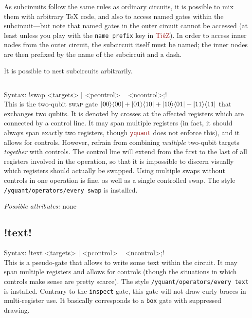 \documentclass{scrartcl}
\def\TikZ{\textcolor{brown}{Ti\textit kZ}}
\def\pkg#1{\textcolor{brown}{\texttt{#1}}}
\def\ttlink{\link\texttt}
\def\Yquant{\pkg{yquant}}
\def\ketbra#1#2{\ket{#1}\!\bra{#2}}
\begin{document}
\begin{itemize}
               As subcircuits follow the same rules as ordinary circuits, it is possible to mix them with arbitrary \TeX{} code, and also to access named gates within the subcircuit---but note that named gates in the outer circuit cannot be accessed (at least unless you play with the \texttt{name prefix} key in \TikZ).
               In order to access inner nodes from the outer circuit, the subcircuit itself must be named; the inner nodes are then prefixed by the name of the subcircuit and a dash.

               It is possible to nest subcircuits arbitrarily.
         \end{itemize}

      \subsection{\texorpdfstring{}{swap}}
         Syntax: \yquant!swap <targets> | <pcontrol> ~ <ncontrol>;! \\
         This is the two\hyp qubit \textsc{swap} gate $\ketbra{00}{00} + \ketbra{01}{10} + \ketbra{10}{01} + \ketbra{11}{11}$ that exchanges two qubits.
         It is denoted by crosses at the affected registers which are connected by a control line.
         It may span multiple registers (in fact, it should always span exactly two registers, though \Yquant{} does not enforce this), and it allows for controls.
         However, refrain from combining \emph{multiple} two\hyp qubit targets \emph{together} with controls.
         The control line will extend from the first to the last of all registers involved in the operation, so that it is impossible to discern visually which registers should actually be swapped.
         Using multiple swaps without controls in one operation is fine, as well as a single controlled swap.
         The style \ttlink{/yquant/operators/every swap} is installed.

         \emph{Possible attributes:} none

      \subsection[\texorpdfstring{\yquant{text}}{text}]{\yquant!text!}
         Syntax: \yquant!text <targets> | <pcontrol> ~ <ncontrol>;! \\
         This is a pseudo\hyp gate that allows to write some text within the circuit.
         It may span multiple registers and allows for controls (though the situations in which controls make sense are pretty scarce).
         The style \ttlink{/yquant/operators/every text} is installed.
         Contrary to the \ttlink{inspect} gate, this gate will not draw curly braces in multi\hyp register use.
         It basically corresponds to a \ttlink{box} gate with suppressed drawing.
\end{document}
